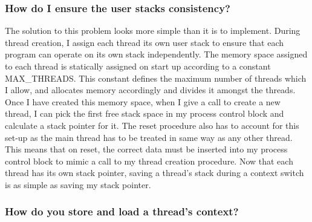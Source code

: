 \subsubsection{How do I ensure the user stacks consistency?}
The solution to this problem looks more simple than it is to implement. During thread creation, I assign each thread its own user stack to ensure that each program can operate on its own stack independently. The memory space assigned to each thread is statically assigned on start up according to a constant MAX\_THREADS. This constant defines the maximum number of threads which I allow, and allocates memory accordingly and divides it amongst the threads.  Once I have created this memory space, when I give a call to create a new thread, I can pick the first free stack space in my process control block and calculate a stack pointer for it. The reset procedure also has to account for this set-up as the main thread has to be treated in same way as any other thread.  This means that on reset, the correct data must be inserted into my process control block to mimic a call to my thread creation procedure. Now that each thread has its own stack pointer, saving a thread's stack during a context switch is as simple as saving my stack pointer.
\newpage
\subsubsection{How do you store and load a thread's context?}


